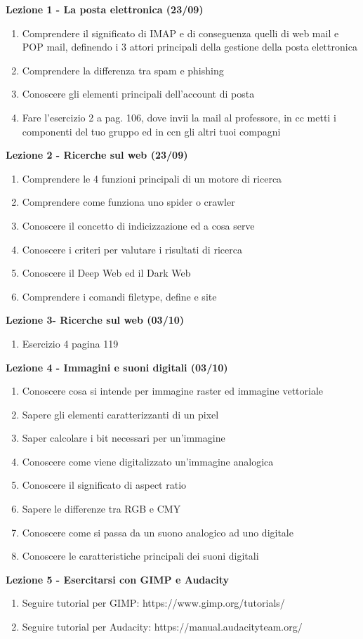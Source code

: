 \documentclass{article}
\begin{document}
	\begin{center}
		\textbf{Lezione 1 - La posta elettronica (23/09)}
		\begin{enumerate}
			\item Comprendere il significato di IMAP e di conseguenza quelli di web mail e POP mail, definendo i 3 attori principali della gestione della posta elettronica
			\item Comprendere la differenza tra spam e phishing
			\item Conoscere gli elementi principali dell'account di posta
			\item Fare l'esercizio 2 a pag. 106, dove invii la mail al professore, in cc metti i componenti del tuo gruppo ed in ccn gli altri tuoi compagni
		\end{enumerate}
		\textbf{Lezione 2 - Ricerche sul web (23/09)}
		\begin{enumerate}
			\item Comprendere le 4 funzioni principali di un motore di ricerca
			\item Comprendere come funziona uno spider o crawler
			\item Conoscere il concetto di indicizzazione ed a cosa serve
			\item Conoscere i criteri per valutare i risultati di ricerca
			\item Conoscere il Deep Web ed il Dark Web
			\item Comprendere i comandi filetype, define e site
		\end{enumerate}
		\textbf{Lezione 3- Ricerche sul web (03/10)}
		\begin{enumerate}
			\item Esercizio 4 pagina 119
		\end{enumerate}
	
		\begin{center}
			\textbf{Lezione 4 - Immagini e suoni digitali (03/10)}
			\begin{enumerate}
				\item Conoscere cosa si intende per immagine raster ed immagine vettoriale
				\item Sapere gli elementi caratterizzanti di un pixel
				\item Saper calcolare i bit necessari per un'immagine
				\item Conoscere come viene digitalizzato un'immagine analogica
				\item Conoscere il significato di aspect ratio 
				\item Sapere le differenze tra RGB e CMY
				\item Conoscere come si passa da un suono analogico ad uno digitale
				\item Conoscere le caratteristiche principali dei suoni digitali
			\end{enumerate}
		\end{center}
	\end{center}
	
	\begin{center}
	\textbf{Lezione 5 - Esercitarsi con GIMP e Audacity}
	\begin{enumerate}
	\item Seguire tutorial per GIMP: https://www.gimp.org/tutorials/
	\item Seguire tutorial per Audacity:  https://manual.audacityteam.org/
	\end{enumerate}
	\end{center}
\end{document}
